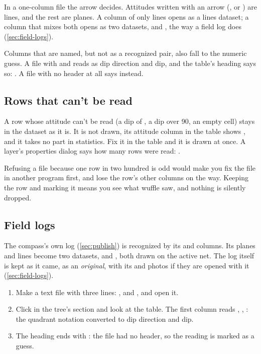In a one-column file the arrow decides. Attitudes written with an arrow (, or
) are lines, and the rest are planes. A column of only lines opens as a lines dataset; a
column that mixes both opens as two datasets,  and , the way a
field log does (\cref{sec:field-logs}).

Columns that are named, but not as a recognized pair, also fall to the numeric guess. A file with
 and  reads as dip direction and dip, and the table's heading says so:
. A file with no
header at all says  instead.

\subsection{Rows that can't be read}

A row whose attitude can't be read (a dip of , a dip over 90, an empty cell) stays in the
dataset as it is. It is not drawn, its attitude column in the table shows , and it takes no part
in statistics. Fix it in the table and it is drawn at once. A layer's properties dialog says how many
rows were read: .

\begin{why}
Refusing a file because one row in two hundred is odd would make you fix the file in another program
first, and lose the row's other columns on the way. Keeping the row and marking it means you see what
wuffle saw, and nothing is silently dropped.
\end{why}

\subsection{Field logs}

The compass's own log (\cref{sec:publish}) is recognized by its  and
 columns. Its planes and lines become two datasets,
 and , both drawn on the active net. The log itself is
kept as it came, as an \emph{original}, with its  and photos if they are opened with it (\cref{sec:field-logs}).

\begin{tryit}
\begin{enumerate}
\item Make a text file  with three lines: ,  and
, and open it.
\item Click  in the tree's  section and look at the table. The first column reads
, , : the quadrant notation converted to dip direction and dip.
\item The heading ends with : the
file had no header, so the reading is marked as a guess.
\end{enumerate}
\end{tryit}

